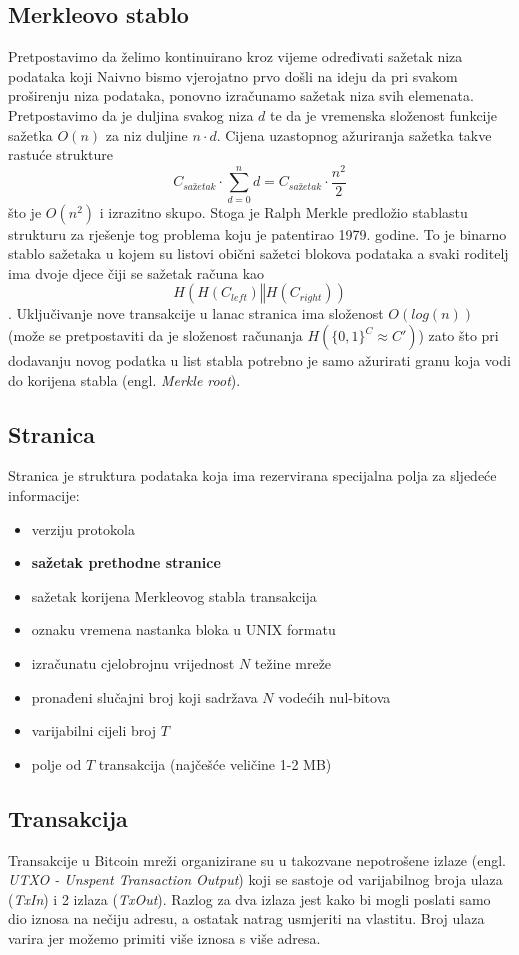 \documentclass[utf8, zavrsni]{fer}
\begin{document}
\subsection{Merkleovo stablo}
Pretpostavimo da želimo kontinuirano kroz vijeme određivati sažetak niza podataka koji
Naivno bismo vjerojatno prvo došli na ideju da pri svakom proširenju niza podataka, ponovno izračunamo sažetak niza svih elemenata. Pretpostavimo da je duljina svakog niza $d$ te da je vremenska složenost funkcije sažetka $O(n)$ za niz duljine $n \cdot d$. Cijena uzastopnog ažuriranja sažetka takve rastuće strukture 
$$
C_{sažetak} \cdot \sum_{d=0}^{n} d = C_{sažetak} \cdot \frac{n^2}{2}
$$
što je $O(n^2)$ i izrazitno skupo. Stoga je Ralph Merkle predložio stablastu strukturu za rješenje tog problema koju je patentirao 1979. godine. To je binarno stablo sažetaka u kojem su listovi obični sažetci blokova podataka a svaki roditelj ima dvoje djece čiji se sažetak računa kao $$ H(H(C_{left}) \mathbin\Vert H(C_{right})) $$.
Uključivanje nove transakcije u lanac stranica ima složenost $O(log(n))$ (može se pretpostaviti da je složenost računanja $H(\{0,1\}^C \approx C')$) zato što pri dodavanju novog podatka u list stabla potrebno je samo ažurirati granu koja vodi do korijena stabla (engl. \textit{Merkle root}).
\subsection{Stranica}
Stranica je struktura podataka koja ima rezervirana specijalna polja za sljedeće informacije:
\begin{itemize}
    \item verziju protokola
    \item \textbf{sažetak prethodne stranice}
    \item sažetak korijena Merkleovog stabla transakcija
    \item oznaku vremena nastanka bloka u UNIX formatu
    \item izračunatu cjelobrojnu vrijednost $ N $ težine mreže
    \item pronađeni slučajni broj koji sadržava $ N $ vodećih nul-bitova
    \item varijabilni cijeli broj $ T $
    \item polje od $ T $ transakcija (najčešće veličine 1-2 MB)
\end{itemize}

\subsection{Transakcija}
Transakcije u Bitcoin mreži organizirane su u takozvane nepotrošene izlaze (engl. \textit{UTXO - Unspent Transaction Output}) koji se sastoje od varijabilnog broja ulaza (\textit{TxIn}) i 2 izlaza (\textit{TxOut}). Razlog za dva izlaza jest kako bi mogli poslati samo dio iznosa na nečiju adresu, a ostatak natrag usmjeriti na vlastitu. Broj ulaza varira jer možemo primiti više iznosa s više adresa.
\end{document}

